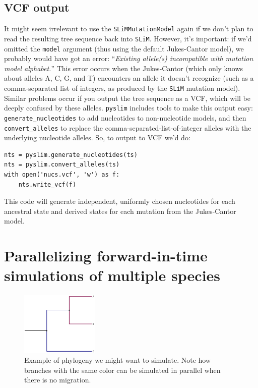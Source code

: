 \documentclass[12pt]{article}
\newcommand{\slim}[0]{\texttt{SLiM}\xspace}
\newcommand{\pyslim}[0]{\texttt{pyslim}\xspace}
\begin{document}
\subsection*{VCF output}

It might seem irrelevant to use the \verb|SLiMMutationModel| again
if we don't plan to read the resulting tree sequence back into \slim.
However, it's important: if we'd omitted the \verb|model| argument
(thus using the default Jukes-Cantor model),
we probably would have got an error:
``\textit{Existing allele(s) incompatible with mutation model alphabet.}''
This error occurs when the Jukes-Cantor (which only knows about alleles A, C, G, and T)
encounters an allele it doesn't recognize
(such as a comma-separated list of integers, as produced by the \slim mutation model).
Similar problems occur if you output the tree sequence as a VCF,
which will be deeply confused by these alleles.
\pyslim includes tools to make this output easy:
\verb|generate_nucleotides| to add nucleotides to non-nucleotide models,
and then \verb|convert_alleles| to replace the comma-separated-list-of-integer alleles
with the underlying nucleotide alleles.
So, to output to VCF we'd do:
\begin{listing}[H]
    \begin{verbatim}
nts = pyslim.generate_nucleotides(ts)
nts = pyslim.convert_alleles(ts)
with open('nucs.vcf', 'w') as f:
    nts.write_vcf(f)
    \end{verbatim}
\end{listing}
This code will generate independent, uniformly chosen nucleotides
for each ancestral state and derived states for each mutation
from the Jukes-Cantor model.


\section*{Parallelizing forward-in-time simulations of multiple species}

\begin{figure}[h!]
    \centering
     \includegraphics[width=0.33\textwidth]{./code/parallelizing_phylogeny/phylo.pdf}
     \caption{Example of phylogeny we might want to simulate. Note how branches with the same color can be simulated in parallel when there is no migration.}
     \label{fig:phylo}
    \end{figure}
\end{document}
